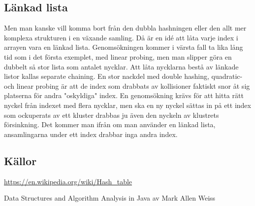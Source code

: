\documentclass[a5paper,10pt,oneside]{article}
\begin{document}
\subsection*{Länkad lista}
Men man kanske vill komma bort från den dubbla hashningen eller den allt mer komplexa strukturen i en växande samling. Då är en idé att låta varje index i arrayen vara en länkad lista. Genomsökningen kommer i värsta fall ta lika lång tid som i det första exemplet, med linear probing, men man slipper göra en dubbelt så stor lista som antalet nycklar. Att låta nycklarna bestå av länkade listor kallas separate chaining. En stor nackdel med double hashing, quadratic- och linear probing är att de index som drabbats av kollisioner faktiskt snor åt sig platserna för andra "oskyldiga" index. En genomsökning krävs för att hitta rätt nyckel från indexet med flera nycklar, men ska en ny nyckel sättas in på ett index som ockuperats av ett kluster drabbas ju även den nyckeln av klustrets försinkning. Det kommer man ifrån om man använder en länkad lista, ansamlingarna under ett index drabbar inga andra index. 


\subsection*{Källor}
 \url{https://en.wikipedia.org/wiki/Hash_table} 
 
Data Structures and Algorithm Analysis in Java av Mark Allen Weiss
\end{document}
